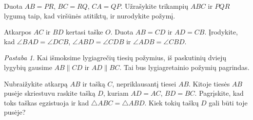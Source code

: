 \documentclass[12pt,a4paper,reqno]{amsart}
\theoremstyle{plain}\newtheorem{theorem}{Teorema}[section]
\theoremstyle{definition}
\theoremstyle{remark}\newtheorem{remark}[theorem]{Pastaba}\newtheorem*{remark*}{Pastaba}
\theoremstyle{definition}\newtheorem*{problem*}{Uždavinys}
\newenvironment{starproblem}{\begingroup\let\numberwithoutstar\thetheorem\renewcommand{\thetheorem}{\numberwithoutstar\textsuperscript{*}}\begin{problem}}{\end{problem}\endgroup}
\begin{document}
\begin{problem}\label{uzd:sss-tiesioginis-01} Duota $AB=PR$, $BC=RQ$, $CA=QP$. Užrašykite trikampių $ABC$ ir $PQR$ lygumą taip, kad viršūnės atitiktų, ir nurodykite požymį. \end{problem}
\begin{problem}\label{uzd:sss-tiesioginis-02} Atkarpos $AC$ ir $BD$ kertasi taške $O$. Duota $AB=CD$ ir $AD=CB$. Įrodykite, kad $\angle BAD=\angle DCB$, $\angle ABD=\angle CDB$ ir $\angle ADB=\angle CBD$. \end{problem}
\begin{remark*} Kai išmoksime lygiagrečių tiesių požymius, iš paskutinių dviejų lygybių gausime $AB\parallel CD$ ir $AD\parallel BC$. Tai bus lygiagretainio požymių pagrindas. \end{remark*}
\begin{starproblem}\label{uzd:sss-konstr-01} Nubraižykite atkarpą $AB$ ir tašką $C$, nepriklausantį tiesei $AB$. Kitoje tiesės $AB$ pusėje skriestuvu raskite tašką $D$, kuriam $AD=AC$, $BD=BC$. Pagrįskite, kad toks taškas egzistuoja ir kad $\triangle ABC=\triangle ABD$. Kiek tokių taškų $D$ gali būti toje pusėje? \end{starproblem}
\end{document}

